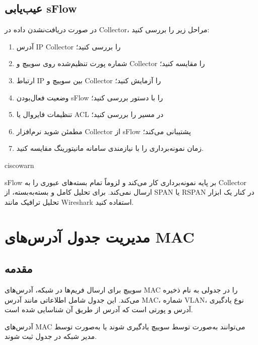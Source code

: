 \documentclass[11pt,letterpaper]{report}
\newenvironment{tipbox}[1]{%
	\begin{noticebox}[title={\textbf{\faLightbulb\ #1}}]{ciscowarn}
	}{%
	\end{noticebox}
}
\begin{document}
	\section{عیب‌یابی sFlow}

	در صورت دریافت‌نشدن داده در Collector، مراحل زیر را بررسی کنید:

	\begin{enumerate}
		\item آدرس IP Collector را بررسی کنید؛
		\item شماره پورت تنظیم‌شده روی سوییچ و Collector را مقایسه کنید؛
		\item ارتباط IP بین سوییچ و Collector را آزمایش کنید؛
		\item وضعیت فعال‌بودن sFlow را با دستور
		 بررسی کنید؛
		\item تنظیمات فایروال یا ACL در مسیر را بررسی کنید؛
		\item مطمئن شوید نرم‌افزار Collector از sFlow پشتیبانی می‌کند؛
		\item زمان نمونه‌برداری را با نیازمندی سامانه مانیتورینگ
		مقایسه کنید.
	\end{enumerate}


	\begin{tipbox}{نکته مدیریتی}
		sFlow بر پایه نمونه‌برداری کار می‌کند و لزوماً تمام بسته‌های
		عبوری را به Collector ارسال نمی‌کند. برای تحلیل کامل و بسته‌به‌بسته،
		از SPAN یا RSPAN در کنار یک ابزار تحلیل ترافیک مانند Wireshark
		استفاده کنید.
	\end{tipbox}



	\chapter{مدیریت جدول آدرس‌های MAC}

	\section{مقدمه}

	سوییچ برای ارسال فریم‌ها در شبکه، آدرس‌های MAC را در جدولی به
	نام  ذخیره می‌کند. این جدول شامل اطلاعاتی
	مانند آدرس MAC، شماره VLAN، نوع یادگیری آدرس و پورتی است که
	آدرس از طریق آن شناسایی شده است.

	آدرس‌های MAC می‌توانند به‌صورت  توسط سوییچ یادگیری
	شوند یا به‌صورت  توسط مدیر شبکه در جدول ثبت شوند.
\end{document}
